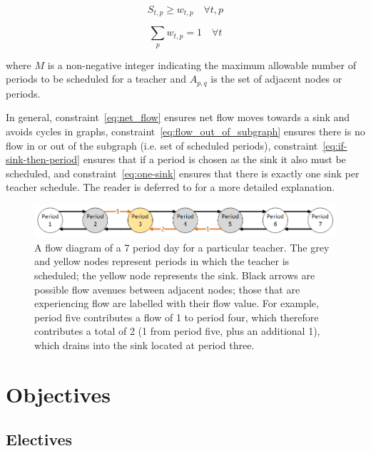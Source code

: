 \documentclass[12pt]{article}
\begin{document}
\begin{equation} \label{eq:if-sink-then-period}
	S_{t,p} \geq w_{t,p} \quad \forall t,p
\end{equation}

\begin{equation} \label{eq:one-sink}
	\displaystyle\sum_{p} w_{t,p} = 1 \quad \forall t
\end{equation}

where $M$ is a non-negative integer indicating the maximum allowable number of periods to be scheduled for a teacher and $A_{p,q}$ is the set of adjacent nodes or periods.

In general, constraint~\ref{eq:net_flow} ensures net flow moves towards a sink and avoids cycles in graphs, constraint~\ref{eq:flow_out_of_subgraph} ensures there is no flow in or out of the subgraph (i.e. set of scheduled periods), constraint~\ref{eq:if-sink-then-period} ensures that if a period is chosen as the sink it also must be scheduled, and constraint~\ref{eq:one-sink} ensures that there is exactly one sink per teacher schedule. The reader is deferred to \cite{shirabe} for a more detailed explanation.

\begin{figure}
	\includegraphics[width=\linewidth]{./flow_diagram}
	\caption{A flow diagram of a 7 period day for a particular teacher. The grey and yellow nodes represent periods in which the teacher is scheduled; the yellow node represents the sink. Black arrows are possible flow avenues between adjacent nodes; those that are experiencing flow are labelled with their flow value. For example, period five contributes a flow of 1 to period four, which therefore contributes a total of 2 (1 from period five, plus an additional 1), which drains into the sink located at period three.}
	\label{fig:flow-diagram}
\end{figure}

\section{Objectives}

\subsection{Electives}
\end{document}
